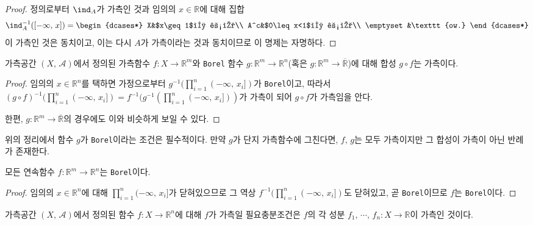 \begin{proof}
    정의로부터 $\ind_A$가 가측인 것과 임의의 $x\in\mathbb{R}$에 대해 집합
    \begin{equation*}
        \ind_A^{-1}([-\infty,\,x])=
        \begin{dcases*}
            X&$x\geq1$인 경우\\
            A^c&$0\leq x<1$인 경우\\
            \emptyset&\texttt{ow.}
        \end{dcases*}
    \end{equation*}
    이 가측인 것은 동치이고, 이는 다시 $A$가 가측이라는 것과 동치이므로 이 명제는 자명하다.
\end{proof}

\begin{theorem}\label{thm:compositionMeasurable}
    가측공간 $(X,\,\mathcal{A})$에서 정의된 가측함수 $f:X\to\mathbb{R}^m$와 \texttt{Borel} 함수 $g:\mathbb{R}^m\to\mathbb{R}^n$(혹은 $g:\mathbb{R}^m\to\overline{\mathbb{R}}$)에 대해 합성 $g\circ f$는 가측이다.
\end{theorem}

\begin{proof}
    임의의 $x\in\mathbb{R}^n$를 택하면 가정으로부터 $g^{-1}(\prod_{i=1}^n(-\infty,\,x_i])$가 \texttt{Borel}이고, 따라서 $(g\circ f)^{-1}(\prod_{i=1}^n(-\infty,\,x_i])=f^{-1}(g^{-1}(\prod_{i=1}^n(-\infty,\,x_i]))$가 가측이 되어 $g\circ f$가 가측임을 안다.
    
    한편, $g:\mathbb{R}^m\to\overline{\mathbb{R}}$의 경우에도 이와 비슷하게 보일 수 있다.
\end{proof}

위의 정리에서 함수 $g$가 \texttt{Borel}이라는 조건은 필수적이다. 만약 $g$가 단지 가측함수에 그친다면, $f,\,g$는 모두 가측이지만 그 합성이 가측이 아닌 반례가 존재한다.\footnotemark

\begin{theorem}\label{thm:continuousMeasurable}
    모든 연속함수 $f:\mathbb{R}^m\to\mathbb{R}^n$는 \texttt{Borel}이다.
\end{theorem}

\begin{proof}
    임의의 $x\in\mathbb{R}^n$에 대해 $\prod_{i=1}^n(-\infty,\,x_i]$가 닫혀있으므로 그 역상 $f^{-1}(\prod_{i=1}^n(-\infty,\,x_i])$도 닫혀있고, 곧 \texttt{Borel}이므로 $f$는 \texttt{Borel}이다.
\end{proof}

\begin{theorem}\label{thm:componentMeasurable}
    가측공간 $(X,\,\mathcal{A})$에서 정의된 함수 $f:X\to\mathbb{R}^n$에 대해 $f$가 가측일 필요충분조건은 $f$의 각 성분 $f_1,\,\cdots,\,f_n:X\to\mathbb{R}$이 가측인 것이다.
\end{theorem}

